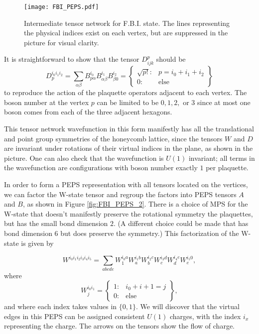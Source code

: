 \begin{figure}[H]
	\centering
	\texttt{[image: FBI\_PEPS.pdf]}
	\caption{Intermediate tensor network for F.B.I. state. The lines representing the physical indices exist on each vertex, but are suppressed in the picture for visual clarity.}
	\label{fig:FBI_PEPS}
\end{figure}

It is straightforward to show that the tensor $D^p_{ijk}$ should be
$$
D_{p}^{i_0 i_1 i_2} = \sum\limits_{\alpha \beta} B^{i_0}_{p \alpha}B^{i_1}_{\alpha \beta} B^{i_2}_{\beta 0}  = \left\{ \begin{array}{lr}
													\sqrt{p!}  : & p =i_0+i_1+i_2  \\
													0  : & \text{else}
													\end{array}
											\right\}
$$
to reproduce the action of the plaquette operators adjacent to each vertex. The boson number at the vertex $p$ can be limited to be $0, 1, 2,$ or $3$ since at most one boson comes from each of the three adjacent hexagons.

This tensor network wavefunction in this form manifestly has all the translational and point group symmetries of the honeycomb lattice, since the tensors $W$ and $D$ are invariant under rotations of their virtual indices in the plane, as shown in the picture. One can also check that the wavefunction is $U(1)$ invariant; all terms in the wavefunction are configurations with boson number exactly $1$ per plaquette.

In order to form a PEPS representation with all tensors located on the vertices, we can factor the W-state tensor and regroup the factors into PEPS tensors $A$ and $B$, as shown in Figure \ref{fig:FBI_PEPS_2}. 
There is a choice of MPS for the W-state that doesn't manifestly preserve the rotational symmetry the plaquettes, but has the small bond dimension $2$. (A different choice could be made that has bond dimension 6 but does preserve the symmetry.) This factorization of the W-state is given by

$$
W^{i_0 i_1 i_2 i_3 i_4 i_5} = \sum\limits_{abcde} W^{i_0 a}_{1} W^{i_1 b}_{a} W^{i_2 c}_{b} W^{i_3 d}_{c} W^{i_4 e}_{d} W^{i_5 0}_{e},
$$
where 
$$ W^{i_0 i_1}_{j}  = \left\{ \begin{array}{lr}
													1  : & i_0+i+1 = j \\
													0  : & \text{else}
													\end{array}
											\right\},
$$
and where each index takes values in $\{0, 1\}$. We will discover that the virtual edges in this PEPS can be assigned consistent $U(1)$ charges, with the index $i_x$ representing the charge. The arrows on the tensors show the flow of charge.

